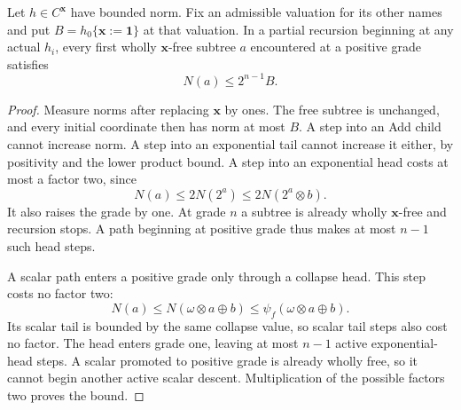 \begin{lemma}
\label{lem:first-free-subtree}
Let $h\in C^{\mathbf x}$ have bounded norm.  Fix an admissible
valuation for its other names and put
$B=h_0\{\mathbf x:=\mathbf1\}$ at that valuation.
In a partial recursion beginning at any actual $h_i$, every first
wholly $\mathbf x$-free subtree $a$ encountered at a positive
grade satisfies
\[
 N(a)\le2^{n-1}B.
\]
\end{lemma}
\begin{proof}
Measure norms after replacing $\mathbf x$ by ones.  The free
subtree is unchanged, and every initial coordinate then has norm at
most $B$.  A step into an Add child cannot increase norm.  A step
into an exponential tail cannot increase it either, by positivity and
the lower product bound.  A step into an exponential head costs at
most a factor two, since
\[
 N(a)\le2N(2^a)\le2N(2^a\otimes b).
\]
It also raises the grade by one.  At grade $n$ a subtree is already
wholly $\mathbf x$-free and recursion stops.  A path beginning
at positive grade thus makes at most $n-1$ such head steps.

A scalar path enters a positive grade only through a collapse head.
This step costs no factor two:
\[
 N(a)\le N(\omega\otimes a\oplus b)
       \le\psi_f(\omega\otimes a\oplus b).
\]
Its scalar tail is bounded by the same collapse value, so scalar
tail steps also cost no factor.  The head enters grade one, leaving
at most $n-1$ active exponential-head steps.  A scalar promoted to
positive grade is already wholly free, so it cannot begin another
active scalar descent.  Multiplication of the possible factors two
proves the bound.
\end{proof}

